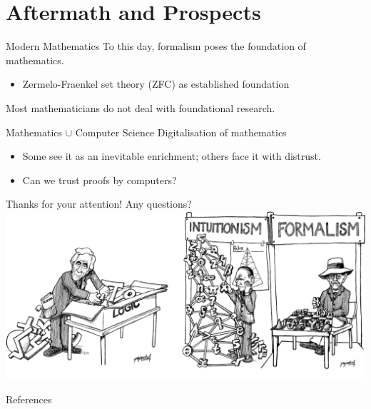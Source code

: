 \documentclass{beamer}
\begin{document}
\section{Aftermath and Prospects}
\begin{frame}{Modern Mathematics}
To this day, formalism poses the foundation of mathematics.
\pause
\begin{itemize}
	\item Zermelo-Fraenkel set theory (ZFC) as established foundation
\end{itemize}
\pause
Most mathematicians do not deal with foundational research.
\end{frame}
\begin{frame}{Mathematics $\cup$ Computer Science}
Digitalisation of mathematics
\pause
    \begin{itemize}[<+->]
	\item Some see it as an inevitable enrichment; others face it with distrust.
	\item Can we trust proofs by computers?
    \end{itemize}
\end{frame}
\begin{frame}
\end{frame}
\begin{frame}
	\center
	\Large{Thanks for your attention! Any questions?}
	\vspace{0.5\baselineskip}\\
	\includegraphics[height=0.6\textheight]{img/logic_intuit_form2.png}
\end{frame}
\begin{frame}[allowframebreaks]{References}
  
  
\end{frame}
\end{document}
